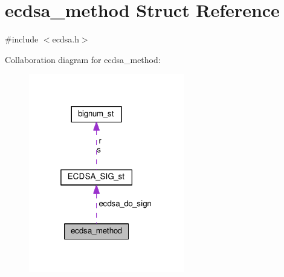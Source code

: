 \hypertarget{structecdsa__method}{}\section{ecdsa\+\_\+method Struct Reference}
\label{structecdsa__method}


{\ttfamily \#include $<$ecdsa.\+h$>$}



Collaboration diagram for ecdsa\+\_\+method\+:
\nopagebreak
\begin{figure}[H]
\begin{center}
\leavevmode
\includegraphics[width=193pt]{structecdsa__method__coll__graph}
\end{center}
\end{figure}
